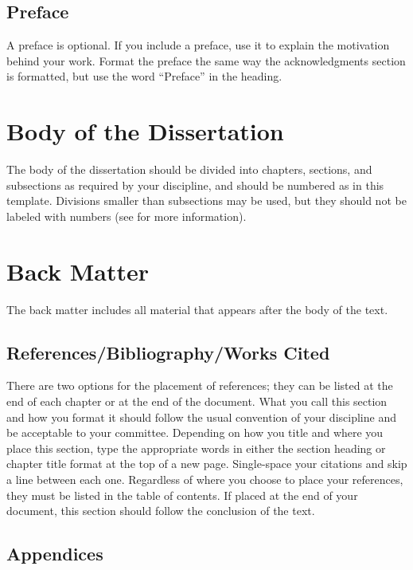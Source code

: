 \subsection{Preface}

A preface is optional.
If you include a preface, use it to explain the motivation behind your work.
Format the preface the same way the acknowledgments section is formatted, but use the word ``Preface'' in the heading.

\section{Body of the Dissertation}

The body of the dissertation should be divided into chapters, sections, and subsections as required by your discipline, and should be numbered as in this template.
Divisions smaller than subsections may be used, but they should not be labeled with numbers (see  for more information).

\section{Back Matter}

The back matter includes all material that appears after the body of the text.

\subsection{References/Bibliography/Works Cited}

There are two options for the placement of references; they can be listed at the end of each chapter or at the end of the document.
What you call this section and how you format it should follow the usual convention of your discipline and be acceptable to your committee.
Depending on how you title and where you place this section, type the appropriate words in either the section heading or chapter title format at the top of a new page.
Single-space your citations and skip a line between each one.
Regardless of where you choose to place your references, they must be listed in the table of contents.
If placed at the end of your document, this section should follow the conclusion of the text.

\subsection{Appendices}

